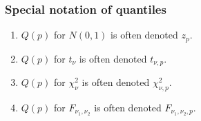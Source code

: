 \documentclass[handout]{beamer}\usepackage[]{graphicx}\usepackage[]{color}
\numberwithin{equation}{section}
\begin{document}
\begin{frame}
\frametitle{Special notation of quantiles}
\begin{enumerate}[1. ]
\item $Q(p)$ for $N(0,1)$ is often denoted $z_p$.
\pause \item $Q(p)$ for $t_\nu$ is often denoted $t_{\nu, p}$.
\pause \item $Q(p)$ for $\chi^2_\nu$ is often denoted $\chi^2_{\nu, p}$.
\pause \item $Q(p)$ for $F_{\nu_1, \nu_2}$ is often denoted $F_{\nu_1, \nu_2, p}$.
\end{enumerate}
\end{frame}
\end{document}
